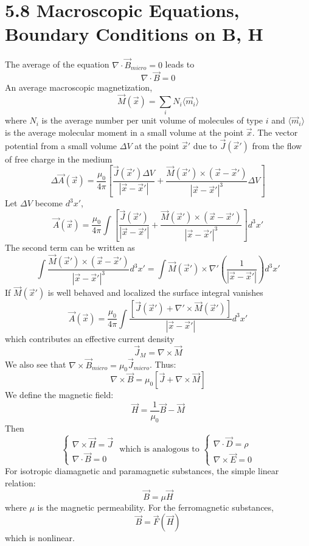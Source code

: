 \documentclass{article}
\begin{document}
	\section*{5.8 Macroscopic Equations, Boundary Conditions on B, H}
	The average of the equation $\nabla \cdot \vec{B}_{micro} = 0$ leads to
	$$ \nabla \cdot \vec{B} = 0 $$
	An average macroscopic magnetization,
	$$ \vec{M}(\vec{x}) = \sum_i N_i \langle \vec{m}_i \rangle $$
	where $N_i$ is the average number per unit volume of molecules of type $i$ and $\langle \vec{m}_i \rangle$ is the average molecular moment in a small volume at the point $\vec{x}$.
	The vector potential from a small volume $\Delta V$ at the point $\vec{x}'$ due to $\vec{J}(\vec{x}')$ from the flow of free charge in the medium
	$$ \Delta \vec{A}(\vec{x}) = \frac{\mu_0}{4\pi} \left[ \frac{\vec{J}(\vec{x}') \Delta V}{|\vec{x}-\vec{x}'|} + \frac{\vec{M}(\vec{x}') \times (\vec{x}-\vec{x}')}{|\vec{x}-\vec{x}'|^3} \Delta V \right] $$
	Let $\Delta V$ become $d^3x'$,
	$$ \vec{A}(\vec{x}) = \frac{\mu_0}{4\pi} \int \left[ \frac{\vec{J}(\vec{x}')}{|\vec{x}-\vec{x}'|} + \frac{\vec{M}(\vec{x}') \times (\vec{x}-\vec{x}')}{|\vec{x}-\vec{x}'|^3} \right] d^3x' $$
	The second term can be written as
	$$ \int \frac{\vec{M}(\vec{x}') \times (\vec{x}-\vec{x}')}{|\vec{x}-\vec{x}'|^3} d^3x' = \int \vec{M}(\vec{x}') \times \nabla' \left( \frac{1}{|\vec{x}-\vec{x}'|} \right) d^3x' $$
	If $\vec{M}(\vec{x}')$ is well behaved and localized the surface integral vanishes
	$$ \vec{A}(\vec{x}) = \frac{\mu_0}{4\pi} \int \frac{[\vec{J}(\vec{x}') + \nabla' \times \vec{M}(\vec{x}')]}{|\vec{x}-\vec{x}'|} d^3x' $$
	which contributes an effective current density
	$$ \vec{J}_M = \nabla \times \vec{M} $$
	We also see that $\nabla \times \vec{B}_{micro} = \mu_0 \vec{J}_{micro}$.
	Thus:
	$$ \nabla \times \vec{B} = \mu_0 [\vec{J} + \nabla \times \vec{M}] $$
	We define the magnetic field:
	$$ \vec{H} = \frac{1}{\mu_0} \vec{B} - \vec{M} $$
	Then
	$$ \left\{ \begin{array}{l} \nabla \times \vec{H} = \vec{J} \\ \nabla \cdot \vec{B} = 0 \end{array} \right. \text{ which is analogous to } \left\{ \begin{array}{l} \nabla \cdot \vec{D} = \rho \\ \nabla \times \vec{E} = 0 \end{array} \right. $$
	For isotropic diamagnetic and paramagnetic substances, the simple linear relation:
	$$ \vec{B} = \mu \vec{H} $$
	where $\mu$ is the magnetic permeability.
	For the ferromagnetic substances,
	$$ \vec{B} = \vec{F}(\vec{H}) $$
	which is nonlinear.
	
\end{document}

